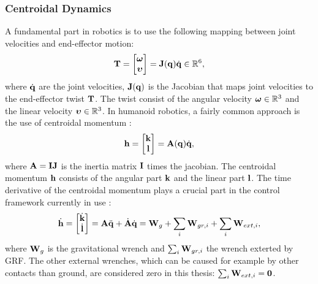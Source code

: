 \subsubsection{Centroidal Dynamics}
A fundamental part in robotics is to use the following mapping between joint velocities and end-effector motion:
\begin{equation}\label{eq:jacobian}
\mathbf{T}=\begin{bmatrix}\boldsymbol{\omega} \\ \boldsymbol{\upsilon} \end{bmatrix} = \mathbf{J}(\mathbf{q})\dot{\mathbf{q}} \in \mathbb{R}^6,
\end{equation}
where $\dot{\mathbf{q}}$ are the joint velocities, $\mathbf{J}(\mathbf{q})$ is the Jacobian that maps joint velocities to the end-effector twist $\mathbf{T}$. The twist consist of the angular velocity $\boldsymbol{\omega} \in \mathbb{R}^3$ and the linear velocity $\boldsymbol{\upsilon} \in \mathbb{R}^3$. In humanoid robotics, a fairly common approach is the use of centroidal momentum \cite{orin2013centroidal}:
\begin{equation}
\mathbf{h}=\begin{bmatrix}\mathbf{k} \\ \mathbf{l} \end{bmatrix} =\mathbf{A}(\mathbf{q})\dot{\mathbf{q}},
\end{equation}
 where $\mathbf{A}=\mathbf{I}\mathbf{J}$ is the inertia matrix $\mathbf{I}$ times the jacobian. The centroidal momentum $\mathbf{h}$ consists of the angular part $\mathbf{k}$ and the linear part $\mathbf{l}$. The time derivative of the centroidal momentum plays a crucial part in the control framework currently in use \cite{koolen2016design}:
\begin{equation}
\dot{\mathbf{h}}=\begin{bmatrix}\dot{\mathbf{k}}\\ \dot{\mathbf{l}} \end{bmatrix} =\mathbf{A}\ddot{\mathbf{q}} +\dot{\mathbf{A}}\dot{\mathbf{q}} = \mathbf{W}_g + \sum_i\mathbf{W}_{gr,i} + \sum_i \mathbf{W}_{ext,i}, 
\end{equation}
where $\mathbf{W}_g$ is the gravitational wrench and $\sum_i\mathbf{W}_{gr,i}$ the wrench exterted by \ac{GRF}. The other external wrenches, which can be caused for example by other contacts than ground, are considered zero in this thesis: $\sum_i \mathbf{W}_{ext,i}=\mathbf{0}$.
